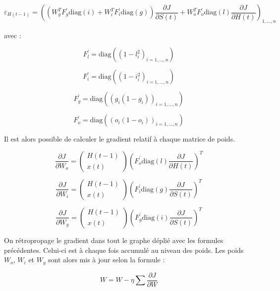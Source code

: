 \begin{equation}
\varepsilon_{H(t-1)} = \left((W_{g}^{T}F_{g}^{\prime}\text{diag}(i) + W_{i}^{T}F_{i}^{\prime}\text{diag}(g))\frac{\partial J}{\partial S(t)} + W_{o}^{T}F_{o}^{\prime}\text{diag}(l)\frac{\partial J}{\partial H(t)}\right)_{1,...,n}
\end{equation}

avec :

\[
F_{l}^{\prime} = \text{diag}((1 - l_{i}^{2})_{i=1,...,n})
\]

\[
F_{i}^{\prime} = \text{diag}((1 - i_{i}^{2})_{i=1,...,n})
\]

\[
F_{g}^{\prime} = \text{diag}((g_{i}(1 - g_{i}))_{i=1,...,n})
\]

\[
F_{o}^{\prime} = \text{diag}((o_{i}(1 - o_{i}))_{i=1,...,n})
\]


Il est alors possible de calculer le gradient relatif à chaque matrice de poids.

\begin{equation}
\frac{\partial J}{\partial W_{o}}=
\begin{pmatrix}
H(t-1) \\
x(t)
\end{pmatrix}
\left(F_{o}^{\prime}\text{diag}(l)\frac{\partial J}{\partial H(t)}\right)^{T}
\end{equation}

\begin{equation}
\frac{\partial J}{\partial W_{i}}=
\begin{pmatrix}
H(t-1) \\
x(t)
\end{pmatrix}
\left(F_{i}^{\prime}\text{diag}(g)\frac{\partial J}{\partial S(t)}\right)^{T}
\end{equation}

\begin{equation}
\frac{\partial J}{\partial W_{g}}=
\begin{pmatrix}
H(t-1) \\
x(t)
\end{pmatrix}
\left(F_{g}^{\prime}\text{diag}(i)\frac{\partial J}{\partial S(t)}\right)^{T}
\end{equation}

On rétropropage le gradient dans tout le graphe déplié avec les formules précédentes. Celui-ci est à chaque fois accumulé au niveau des poids. Les poids $W_{o}$, $W_{i}$ et $W_{g}$ sont alors mis à jour selon la formule :

\begin{equation}
W = W - \eta \sum{\frac{\partial J}{\partial W}}
\end{equation} 


